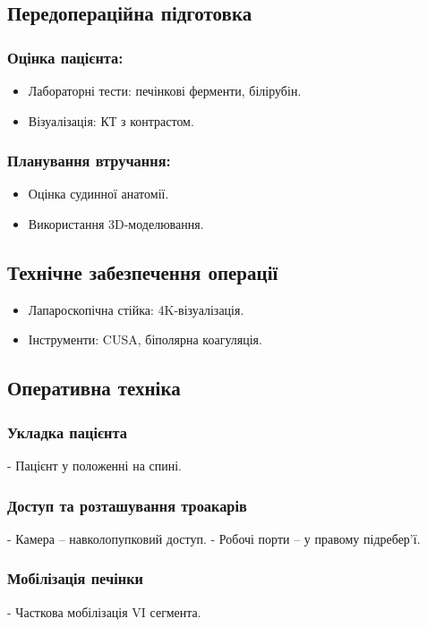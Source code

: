 \begin{refsection}
\subsection{Передопераційна підготовка}
\subsubsection{Оцінка пацієнта:}
\begin{itemize}
    \item Лабораторні тести: печінкові ферменти, білірубін.
    \item Візуалізація: КТ з контрастом.
\end{itemize}

\subsubsection{Планування втручання:}
\begin{itemize}
    \item Оцінка судинної анатомії.
    \item Використання 3D-моделювання.
\end{itemize}

\subsection{Технічне забезпечення операції}
\begin{itemize}
    \item Лапароскопічна стійка: 4K-візуалізація.
    \item Інструменти: CUSA, біполярна коагуляція.
\end{itemize}

\subsection{Оперативна техніка}
\subsubsection{Укладка пацієнта}
- Пацієнт у положенні на спині.

\subsubsection{Доступ та розташування троакарів}
- Камера – навколопупковий доступ.
- Робочі порти – у правому підребер'ї.

\subsubsection{Мобілізація печінки}
- Часткова мобілізація VI сегмента.


\end{refsection}
